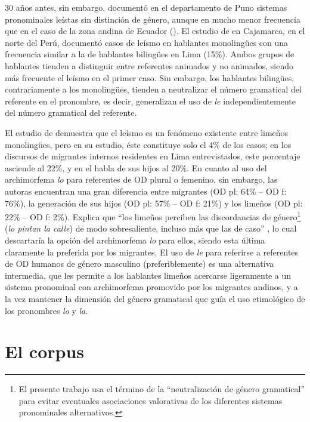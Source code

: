 \documentclass[output=paper]{../langscibook}
\begin{document}
30 años antes, sin embargo, \citet{Godenzzi1986} documentó en el departamento de Puno sistemas pronominales leístas sin distinción de género, aunque en mucho menor frecuencia que en el caso de la zona andina de Ecuador (\citealt{KleeLynch2009book}). El estudio de \citet{ParedesValdez2008} en Cajamarca, en el norte del Perú, documentó casos de leísmo en hablantes monolingües con una frecuencia similar a la de hablantes bilingües en Lima (15\%). Ambos grupos de hablantes tienden a distinguir entre referentes animados y no animados, siendo más frecuente el leísmo en el primer caso. Sin embargo, los hablantes bilingües, contrariamente a los monolingües, tienden a neutralizar el número gramatical del referente en el pronombre, es decir, generalizan el uso de \textit{le} independientemente del número gramatical del referente.

El estudio de \citet{KleeCaravedo2005} demuestra que el leísmo es un fenómeno existente entre limeños monolingües, pero en su estudio, éste constituye solo el 4\% de los casos; en los discursos de migrantes internos residentes en Lima entrevistados, este porcentaje asciende al 22\%, y en el habla de sus hijos al 20\%. En cuanto al uso del archimorfema \textit{lo} para referentes de OD plural o femenino, sin embargo, las autoras encuentran una gran diferencia entre migrantes (OD pl: 64\% – OD f: 76\%), la generación de sus hijos (OD pl: 57\% – OD f: 21\%) y los limeños (OD pl: 22\% – OD f: 2\%). Explica que “los limeños perciben las discordancias de género\footnote{El presente trabajo usa el término de la “neutralización de género gramatical” para evitar eventuales asociaciones valorativas de los diferentes sistemas pronominales alternativos.} (\textit{lo pintan la calle}) de modo sobresaliente, incluso más que las de caso”  \citep[285]{Caravedo2014}, lo cual descartaría la opción del archimorfema \textit{lo} para ellos, siendo esta última claramente la preferida por los migrantes. El uso de \textit{le} para referirse a referentes de OD humanos de género masculino (preferiblemente) es una alternativa intermedia, que les permite a los hablantes limeños acercarse ligeramente a un sistema pronominal con archimorfema promovido por los migrantes andinos, y a la vez mantener la dimensión del género gramatical que guía el uso etimológico de los pronombres \textit{lo} y \textit{la}. 

\section{El corpus}\label{sec:mick:3}
\end{document}
